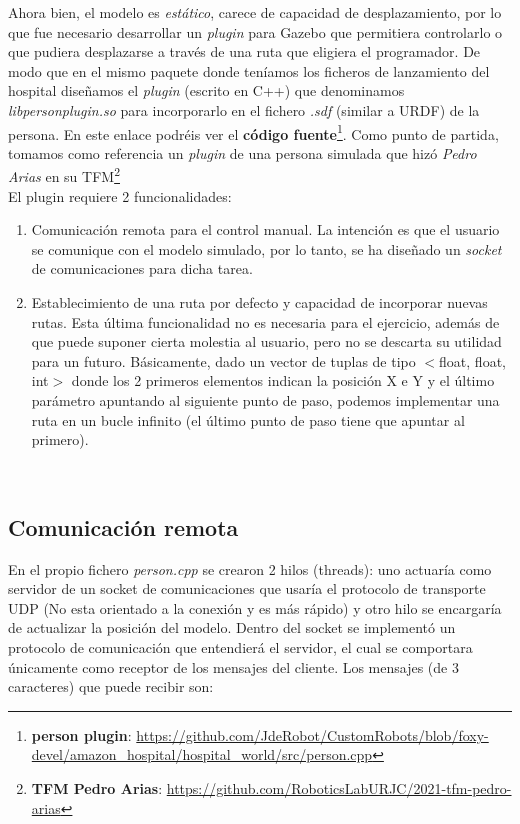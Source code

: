 Ahora bien, el modelo es \textit{estático}, carece de capacidad de desplazamiento, por lo que fue necesario desarrollar un \textit{plugin} para Gazebo que permitiera controlarlo o que pudiera desplazarse a través de una ruta que eligiera el programador. De modo que en el mismo paquete donde teníamos los ficheros de lanzamiento del hospital diseñamos el \textit{plugin} (escrito en C++) que denominamos \textit{libpersonplugin.so} para incorporarlo en el fichero \textit{.sdf} (similar a URDF) de la persona. En este enlace podréis ver el \textbf{código fuente}\footnote{\textbf{person plugin}: \url{https://github.com/JdeRobot/CustomRobots/blob/foxy-devel/amazon_hospital/hospital_world/src/person.cpp}}. Como punto de partida, tomamos como referencia un \textit{plugin} de una persona simulada que hizó \textit{Pedro Arias} en su TFM\footnote{\textbf{TFM Pedro Arias}: \url{https://github.com/RoboticsLabURJC/2021-tfm-pedro-arias}}\\

El plugin requiere 2 funcionalidades:
\begin{enumerate}
	\item Comunicación remota para el control manual. La intención es que el usuario se comunique con el modelo simulado, por lo tanto, se ha diseñado un \textit{socket} de comunicaciones para dicha tarea.
	\item Establecimiento de una ruta por defecto y capacidad de incorporar nuevas rutas. Esta última funcionalidad no es necesaria para el ejercicio, además de que puede suponer cierta molestia al usuario, pero no se descarta su utilidad para un futuro. Básicamente, dado un vector de tuplas de tipo $<$float, float, int$>$ donde los 2 primeros elementos indican la posición X e Y y el último parámetro apuntando al siguiente punto de paso, podemos implementar una ruta en un bucle infinito (el último punto de paso tiene que apuntar al primero).
\end{enumerate}\




\subsection{Comunicación remota}
\label{subsec:comunicacion_remota}

En el propio fichero \textit{person.cpp} se crearon 2 hilos (threads): uno actuaría como servidor de un socket de comunicaciones que usaría el protocolo de transporte UDP (No esta orientado a la conexión y es más rápido) y otro hilo se encargaría de actualizar la posición del modelo. Dentro del socket se implementó un protocolo de comunicación que entendierá el servidor, el cual se comportara únicamente como receptor de los mensajes del cliente. Los mensajes (de 3 caracteres) que puede recibir son:\\

